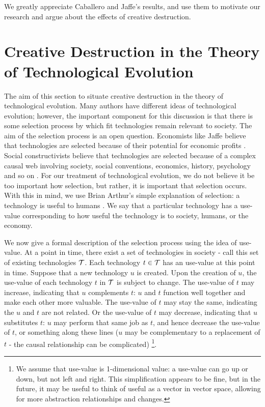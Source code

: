 \documentclass[11pt]{article}
\begin{document}
We greatly appreciate Caballero and Jaffe's results, and use them to motivate our research and argue about the effects of creative destruction.

\section{Creative Destruction in the Theory of Technological Evolution}
The aim of this section to situate creative destruction in the theory of technological evolution.
Many authors have different ideas of technological evolution; however, the important component for this discussion is that there is some selection process by which fit technologies remain relevant to society.
The aim of the selection process is an open question.
Economists like Jaffe believe that technologies are selected because of their potential for economic profits \cite{jaffe}.
Social constructivists believe that technologies are selected because of a complex causal web involving society, social conventions, economics, history, psychology and so on \cite{scot}.
For our treatment of technological evolution, we do not believe it be too important how selection, but rather, it is important that selection occurs. 
With this in mind, we use Brian Arthur's simple explanation of selection: a technology is useful to humans \cite{arthur}.
We say that a particular technology has a use-value corresponding to how useful the technology is to society, humans, or the economy. 

We now give a formal description of the selection process using the idea of use-value. 
At a point in time, there exist a set of technologies in society - call this set of existing technologies $\mathcal{T}$. 
Each technology $t \in \mathcal{T}$ has an use-value at this point in time. 
Suppose that a new technology $u$ is created.
Upon the creation of $u$, the use-value of each technology $t$ in $\mathcal{T}$ is subject to change.
The use-value of $t$ may increase, indicating that $u$ complements $t$: $u$ and $t$ function well together and make each other more valuable.
The use-value of $t$ may stay the same, indicating the $u$ and $t$ are not related.
Or the use-value of $t$ may decrease, indicating that $u$ substitutes $t$: $u$ may perform that same job as $t$, and hence decrease the use-value of $t$, or something along these lines ($u$ may be complementary to a replacement of $t$ - the causal relationship can be complicated)
\footnote{We assume that use-value is 1-dimensional value: a use-value can go up or down, but not left and right. 
This simplification appears to be fine, but in the future, it may be useful to think of useful as a vector in vector space, allowing for more abstraction relationships and changes.}.
\end{document}
